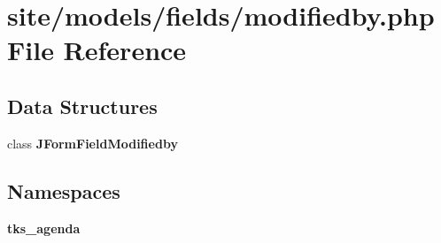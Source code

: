 \section{site/models/fields/modifiedby.php File Reference}
\label{site_2models_2fields_2modifiedby_8php}
\subsection*{Data Structures}
\begin{DoxyCompactItemize}
\item 
class \textbf{ J\+Form\+Field\+Modifiedby}
\end{DoxyCompactItemize}
\subsection*{Namespaces}
\begin{DoxyCompactItemize}
\item 
 \textbf{ tks\+\_\+agenda}
\end{DoxyCompactItemize}
